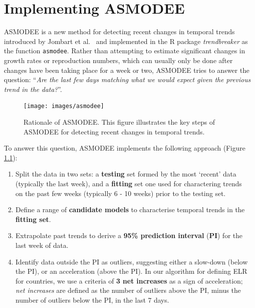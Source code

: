 \documentclass[]{book}
\begin{document}
\hypertarget{asmodee}{%
\chapter{Implementing ASMODEE}\label{asmodee}}

ASMODEE is a new method for detecting recent changes in temporal trends
introduced by Jombart et al.~\citep{Jombart2021-ws} and implemented in the R package
\emph{trendbreaker} \citep{R-trendbreaker} as the function \texttt{asmodee}. Rather than
attempting to estimate significant changes in growth rates or reproduction
numbers, which can usually only be done after changes have been taking place for
a week or two, ASMODEE tries to answer the question: ``\emph{Are the last few days
matching what we would expect given the previous trend in the data?}''.

\begin{figure}

{\centering \texttt{[image: images/asmodee]} 

}

\caption{Rationale of ASMODEE. This figure illustrates the key steps of ASMODEE for detecting recent changes in temporal trends.}\label{fig:asmodee}
\end{figure}

To answer this question, ASMODEE implements the following approach (Figure
\ref{fig:asmodee}):

\begin{enumerate}
\def\labelenumi{\arabic{enumi}.}
\item
  Split the data in two sets: a \textbf{testing} set formed by the most `recent'
  data (typically the last week), and a \textbf{fitting} set one used for
  charactering trends on the past few weeks (typically 6 - 10 weeks) prior to
  the testing set.
\item
  Define a range of \textbf{candidate models} to characterise temporal trends in the
  \textbf{fitting set}.
\item
  Extrapolate past trends to derive a \textbf{95\% prediction interval} (\textbf{PI}) for the last
  week of data.
\item
  Identify data outside the PI as outliers, suggesting either a slow-down
  (below the PI), or an acceleration (above the PI). In our algorithm for
  defining ELR for countries, we use a criteria of \textbf{3 net increases} as a
  sign of acceleration; \emph{net increases} are defined as the number of outliers
  above the PI, minus the number of outliers below the PI, in the last 7 days.
\end{enumerate}
\end{document}
